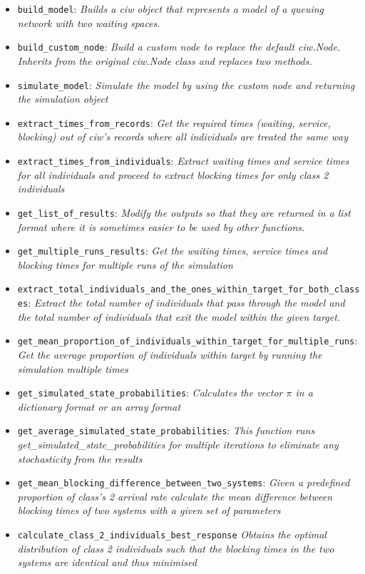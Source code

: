 \begin{itemize}
    \item \lstinline[style=pystyle]{build_model}: \textit{Builds a ciw object 
    that represents a model of a queuing network with two waiting spaces.}
    \item \lstinline[style=pystyle]{build_custom_node}: \textit{Build a custom 
    node to replace the default ciw.Node. Inherits from the original ciw.Node 
    class and replaces two methods.}
    \item \lstinline[style=pystyle]{simulate_model}: \textit{Simulate the model
    by using the custom node and returning the simulation object}
    \item \lstinline[style=pystyle]{extract_times_from_records}: \textit{Get the
    required times (waiting, service, blocking) out of ciw's records where all 
    individuals are treated the same way}
    \item \lstinline[style=pystyle]{extract_times_from_individuals}: \textit{
    Extract waiting times and service times for all individuals and proceed to 
    extract blocking times for only class 2 individuals}
    \item \lstinline[style=pystyle]{get_list_of_results}: \textit{Modify the 
    outputs so that they are returned in a list format where it is sometimes 
    easier to be used by other functions.}
    \item \lstinline[style=pystyle]{get_multiple_runs_results}: \textit{Get the 
    waiting times, service times and blocking times for multiple runs of the 
    simulation}
    \item \lstinline[style=pystyle]
    {extract_total_individuals_and_the_ones_within_target_for_both_classes}:
    \hfill\break \textit{Extract the total number of individuals that pass 
    through the model and the total number of individuals that exit the model 
    within the given target.}
    \item \lstinline[style=pystyle]
    {get_mean_proportion_of_individuals_within_target_for_multiple_runs}: 
    \textit{Get the average proportion of individuals within target by running 
    the simulation multiple times}
    \item \lstinline[style=pystyle]{get_simulated_state_probabilities}: \textit{
    Calculates the vector \(\pi\) in a dictionary format or an array format}
    \item \lstinline[style=pystyle]{get_average_simulated_state_probabilities}:
    \textit{This function runs \hfill\break
    get\_simulated\_state\_probabilities for multiple iterations to eliminate 
    any stochasticity from the results}
    \item \lstinline[style=pystyle]
    {get_mean_blocking_difference_between_two_systems}: \textit{Given a 
    predefined proportion of class's 2 arrival rate calculate the mean 
    difference between blocking times of two systems with a given set of 
    parameters}
    \item \lstinline[style=pystyle]{calculate_class_2_individuals_best_response}
    \textit{Obtains the optimal distribution of class 2 individuals such that 
    the blocking times in the two systems are identical and thus minimised}
\end{itemize}
